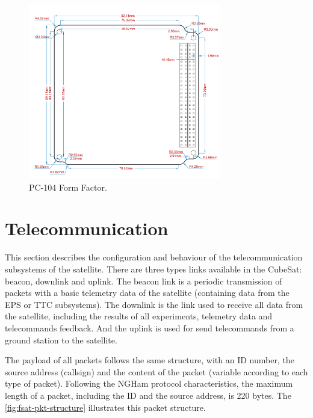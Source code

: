 \begin{figure}[!ht]
    \begin{center}
        \includegraphics[width=0.75\textwidth]{figures/pc104-form-factor.pdf}
        \caption{PC-104 Form Factor.}
        \label{fig:pc104-form-factor}
    \end{center}
\end{figure}

\section{Telecommunication}

This section describes the configuration and behaviour of the telecommunication subsystems of the satellite. There are three types links available in the CubeSat: beacon, downlink and uplink. The beacon link is a periodic transmission of packets with a basic telemetry data of the satellite (containing data from the EPS or TTC subsystems). The downlink is the link used to receive all data from the satellite, including the results of all experiments, telemetry data and telecommands feedback. And the uplink is used for send telecommands from a ground station to the satellite.

The payload of all packets follows the same structure, with an ID number, the source address (callsign) and the content of the packet (variable according to each type of packet). Following the NGHam protocol characteristics, the maximum length of a packet, including the ID and the source address, is 220 bytes. The \autoref{fig:fsat-pkt-structure} illustrates this packet structure.

